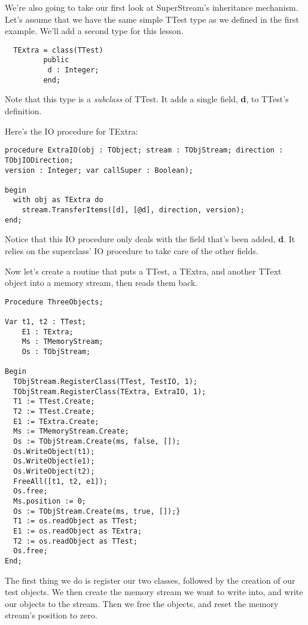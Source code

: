 \documentclass{report}
\begin{document}
We're also going to take our first look at SuperStream's inheritance
mechanism. Let's assume that we have the same simple TTest type as we
defined in the first example. We'll add a second type for this lesson.

\begin{lstlisting}
  TExtra = class(TTest)
	     public
	      d : Integer;
	     end;
\end{lstlisting}

Note that this type is a \emph{subclass} of TTest. It adds a single field,
\textbf{ d}, to TTest's definition.

Here's the IO procedure for TExtra:

\begin{lstlisting}
procedure ExtraIO(obj : TObject; stream : TObjStream; direction : TObjIODirection; 
version : Integer; var callSuper : Boolean);

begin
  with obj as TExtra do
    stream.TransferItems([d], [@d], direction, version);
end;
\end{lstlisting}

Notice that this IO procedure only deals with the field that's been added,
\textbf{d}. It relies on the superclass' IO procedure to take care of the
other fields.

Now let's create a routine that puts a TTest, a TExtra, and another TText
object into a memory stream, then reads them back.

\begin{lstlisting}
Procedure ThreeObjects;

Var t1, t2 : TTest;
    E1 : TExtra;
    Ms : TMemoryStream;
    Os : TObjStream;

Begin
  TObjStream.RegisterClass(TTest, TestIO, 1);
  TObjStream.RegisterClass(TExtra, ExtraIO, 1);
  T1 := TTest.Create;
  T2 := TTest.Create;
  E1 := TExtra.Create;
  Ms := TMemoryStream.Create;
  Os := TObjStream.Create(ms, false, []);
  Os.WriteObject(t1);
  Os.WriteObject(e1);
  Os.WriteObject(t2);
  FreeAll([t1, t2, e1]);
  Os.free;
  Ms.position := 0;
  Os := TObjStream.Create(ms, true, []);}
  T1 := os.readObject as TTest;
  E1 := os.readObject as TExtra;
  T2 := os.readObject as TTest;
  Os.free;
End;
\end{lstlisting}

The first thing we do is register our two classes, followed 
by the creation of our test objects.
We then create the memory stream we want to write into, 
and write our objects to the
stream. Then we free the objects, and reset the memory stream's 
position to zero.
\end{document}
